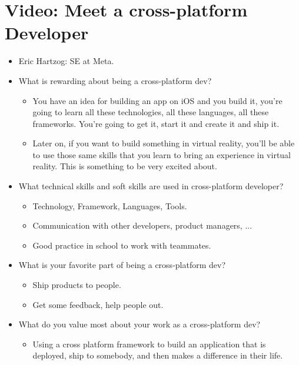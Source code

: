\section{Video: Meet a cross-platform Developer}
\begin{itemize}
    \item Eric Hartzog: SE at Meta.
    \item What is rewarding about being a cross-platform dev?
    \begin{itemize}[label=$\circ$]
        \item You have an idea for building an app on iOS and you build it, you're going to learn all these technologies, all these languages, all these frameworks. You're going to get it, start it and create it and ship it.
        \item Later on, if you want to build something in virtual reality, you'll be able to use those same skills that you learn to bring an experience in virtual reality. This is something to be very excited about.
    \end{itemize}

    \item What technical skills and soft skills are used in cross-platform developer?
    \begin{itemize}[label=$\circ$]
        \item Technology, Framework, Languages, Tools.
        \item Communication with other developers, product managers, ...
        \item Good practice in school to work with teammates.
    \end{itemize}

    \item What is your favorite part of being a cross-platform dev?
    \begin{itemize}[label=$\circ$]
        \item Ship products to people.
        \item Get some feedback, help people out.
    \end{itemize}

    \item What do you value most about your work as a cross-platform dev?
    \begin{itemize}[label=$\circ$]
        \item Using a cross platform framework to build an application that is deployed, ship to somebody, and then makes a difference in their life. 
    \end{itemize}
\end{itemize}

